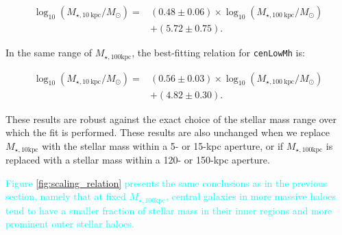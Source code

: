 \documentclass[a4paper,fleqn,usenatbib]{mnras}
\def\nbcg{\texttt{cenLowMh}}
\def\mstar{{$M_{\star}$}}
\def\minn{{$M_{\star,10\mathrm{kpc}}$}}
\def\mtot{{$M_{\star,100\mathrm{kpc}}$}}
\def\mden{{$\mu_{\star}$}}
\newcommand{\song}[1]{\textcolor{cyan}{#1}}
\begin{document}
    \begin{equation}
        \begin{aligned}
        \log_{10} (M_{\star, 10\ \mathrm{kpc}}/M_{\odot}) = & (0.48\pm0.06) \times \log_{10} (M_{\star, 100\ \mathrm{kpc}}/M_{\odot}) \\ & +(5.72\pm0.75).
        \end{aligned}
    \end{equation}
    
    \noindent In the same range of \mtot{}, the best-fitting relation for \nbcg{} is:
     
    \begin{equation}
        \begin{aligned}
        \log_{10} (M_{\star, 10\ \mathrm{kpc}}/M_{\odot}) = & (0.56\pm0.03) \times \log_{10} (M_{\star, 100\ \mathrm{kpc}}/M_{\odot}) \\ & +(4.82\pm0.30).
        \end{aligned}
    \end{equation}
    
    These results are robust against the exact choice of the stellar mass range over which 
    the fit is performed. These results are also unchanged when we replace \minn{} with the stellar 
    mass within a 5- or 15-kpc aperture, or if \mtot{} is replaced with a stellar mass 
    within a 120- or 150-kpc aperture.  
    
    \song{
    Figure \ref{fig:scaling_relation} presents the same conclusions as in 
    the previous section, namely that at fixed \mtot{}, central galaxies in more massive 
    haloes tend to have a smaller fraction of stellar mass in their inner regions and more prominent outer stellar haloes.  
    }
    
    
     
\end{document}
